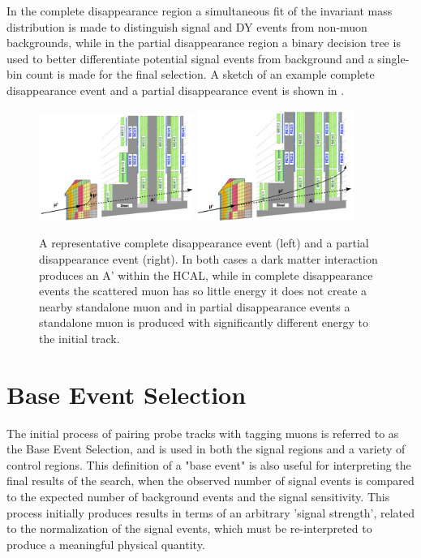 In the complete disappearance region a simultaneous fit of the invariant mass distribution is made to distinguish signal and DY events from non-muon backgrounds, while in the partial disappearance region a binary decision tree is used to better differentiate potential signal events from background and a single-bin count is made for the final selection.
A sketch of an example complete disappearance event and a partial disappearance event is shown in .

\begin{figure}[htpb]
	\centering
	\includegraphics[width=0.45\textwidth]{figures/comp_dis.pdf}
	\hspace{0.01\textwidth}
	\includegraphics[width=0.45\textwidth]{figures/part_dis.pdf}
	\caption[Example Complete and Partial Disappearance Events]{A representative complete disappearance event (left) and a partial disappearance event (right). In both cases a dark matter interaction produces an A' within the HCAL, while in complete disappearance events the scattered muon has so little energy it does not create a nearby standalone muon and in partial disappearance events a standalone muon is produced with significantly different energy to the initial track.}
	\label{fig:sigCatSketch}
\end{figure}

\section{Base Event Selection}
The initial process of pairing probe tracks with tagging muons is referred to as the Base Event Selection, and is used in both the signal regions and a variety of control regions.
This definition of a "base event" is also useful for interpreting the final results of the search, when the observed number of signal events is compared to the expected number of background events and the signal sensitivity.
This process initially produces results in terms of an arbitrary 'signal strength', related to the normalization of the signal events, which must be re-interpreted to produce a meaningful physical quantity.

